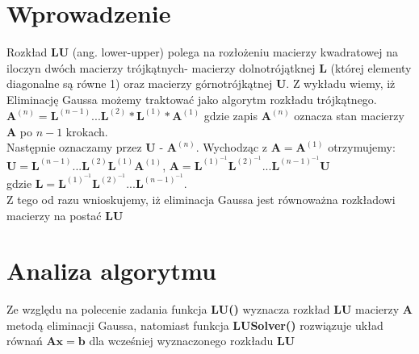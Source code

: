 \documentclass[a4paper,14pt]{report}
\begin{document}
  \section{Wprowadzenie}
  Rozkład \textbf{LU} (ang. lower-upper) polega na rozłożeniu macierzy kwadratowej na iloczyn dwóch macierzy trójkątnych- macierzy dolnotrójątknej 
  \textbf{L} (której elementy diagonalne są równe 1) oraz macierzy górnotrójkątnej \textbf{U}. Z wykładu wiemy, iż Eliminację Gaussa możemy traktować jako algorytm rozkładu trójkątnego.\\
  $\mathbf{A}^{(n)}=\mathbf{L}^{(n-1)}...\mathbf{L}^{(2)}*\mathbf{L}^{(1)}*\mathbf{A}^{(1)}$
  gdzie zapis $\mathbf{A}^{(n)}$ oznacza stan macierzy $\mathbf{A}$ po $n-1$ krokach. \\
  Następnie oznaczamy przez $\mathbf{U}$ - $\mathbf{A}^{(n)}$. Wychodząc z $\mathbf{A}=\mathbf{A}^{(1)}$ otrzymujemy:
  $\mathbf{U}=\mathbf{L}^{(n-1)}...\mathbf{L}^{(2)} \mathbf{L}^{(1)}\mathbf{A}^{(1)}$, $\mathbf{A}=\mathbf{L}^{(1)^{-1}}\mathbf{L}^{(2)^{-1}}...\mathbf{L}^{(n-1)^{-1}}\mathbf{U}$ \\
  gdzie $\mathbf{L}=\mathbf{L}^{(1)^{-1}}\mathbf{L}^{(2)^{-1}}...\mathbf{L}^{(n-1)^{-1}}.$ \\
  Z tego od razu wnioskujemy, iż eliminacja Gaussa jest równoważna rozkładowi macierzy na postać \textbf{LU}
  \section{Analiza algorytmu}
  Ze względu na polecenie zadania funkcja \textbf{LU()} wyznacza rozkład \textbf{LU} macierzy \textbf{A} metodą eliminacji Gaussa, natomiast funkcja \textbf{LUSolver()} rozwiązuje układ równań $\mathbf{Ax=b}$ dla wcześniej wyznaczonego rozkładu \textbf{LU}\\
\end{document}
